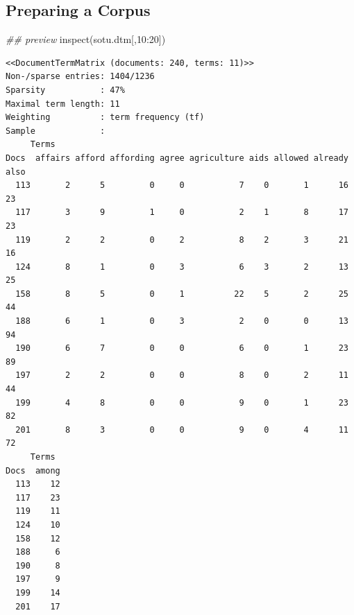 \documentclass[
  letterpaper,
  DIV=11,
  numbers=noendperiod]{scrreprt}
\newenvironment{Shaded}{\begin{snugshade}}{\end{snugshade}}
\newcommand{\DecValTok}[1]{\textcolor[rgb]{0.68,0.00,0.00}{#1}}
\newcommand{\DocumentationTok}[1]{\textcolor[rgb]{0.37,0.37,0.37}{\textit{#1}}}
\newcommand{\FunctionTok}[1]{\textcolor[rgb]{0.28,0.35,0.67}{#1}}
\newcommand{\NormalTok}[1]{\textcolor[rgb]{0.00,0.23,0.31}{#1}}
\newcommand{\OtherTok}[1]{\textcolor[rgb]{0.00,0.23,0.31}{#1}}
\newcommand{\SpecialCharTok}[1]{\textcolor[rgb]{0.37,0.37,0.37}{#1}}
\begin{document}
\hypertarget{preparing-a-corpus}{%
\subsection{Preparing a Corpus}\label{preparing-a-corpus}}

\begin{Shaded}
\end{Shaded}

\begin{Shaded}
\begin{Highlighting}[]
\DocumentationTok{\#\# preview}
\FunctionTok{inspect}\NormalTok{(sotu.dtm[,}\DecValTok{10}\SpecialCharTok{:}\DecValTok{20}\NormalTok{])}
\end{Highlighting}
\end{Shaded}

\begin{verbatim}
<<DocumentTermMatrix (documents: 240, terms: 11)>>
Non-/sparse entries: 1404/1236
Sparsity           : 47%
Maximal term length: 11
Weighting          : term frequency (tf)
Sample             :
     Terms
Docs  affairs afford affording agree agriculture aids allowed already also
  113       2      5         0     0           7    0       1      16   23
  117       3      9         1     0           2    1       8      17   23
  119       2      2         0     2           8    2       3      21   16
  124       8      1         0     3           6    3       2      13   25
  158       8      5         0     1          22    5       2      25   44
  188       6      1         0     3           2    0       0      13   94
  190       6      7         0     0           6    0       1      23   89
  197       2      2         0     0           8    0       2      11   44
  199       4      8         0     0           9    0       1      23   82
  201       8      3         0     0           9    0       4      11   72
     Terms
Docs  among
  113    12
  117    23
  119    11
  124    10
  158    12
  188     6
  190     8
  197     9
  199    14
  201    17
\end{verbatim}
\end{document}
